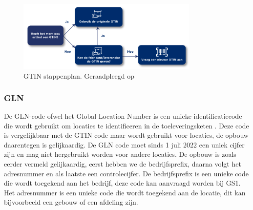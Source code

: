 \begin{figure}[H]
     \centering
     \includegraphics[width=0.8\textwidth]{./img/GTIN.png}
     \caption[GTIN stappenplan]{\label{fig:gtin} GTIN stappenplan. Geraadpleegd op~\cite{GTIN2025} }
\end{figure}

\subsubsection{GLN}
De GLN-code ofwel het Global Location Number is een unieke identificatiecode die wordt gebruikt om locaties te identificeren in de toeleveringsketen \autocite{GLN}.
Deze code is vergelijkbaar met de GTIN-code maar wordt gebruikt voor locaties, de opbouw daarentegen is gelijkaardig.
De GLN code moet sinds 1 juli 2022 een uniek cijfer zijn en mag niet hergebruikt worden voor andere locaties.
De opbouw is zoals eerder vermeld gelijkaardig, eerst hebben we de bedrijfsprefix, daarna volgt het adresnummer en als laatste een controlecijfer.
De bedrijfsprefix is een unieke code die wordt toegekend aan het bedrijf, deze code kan aanvraagd worden bij GS1. Het adresnummer is een unieke code die wordt toegekend aan de locatie, dit kan bijvoorbeeld een gebouw of een afdeling zijn.

